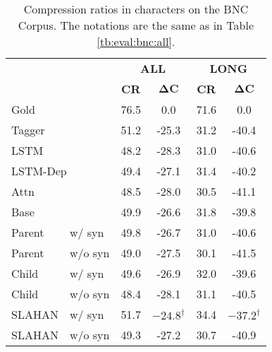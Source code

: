\documentclass[letterpaper]{article} \usepackage{aaai20}  \usepackage{times}  \usepackage{helvet} \usepackage{courier}  \usepackage[hyphens]{url}  \usepackage{graphicx} \urlstyle{rm} \def\UrlFont{\rm}  \usepackage{graphicx}  \frenchspacing  \setlength{\pdfpagewidth}{8.5in}  \setlength{\pdfpageheight}{11in}  \usepackage{tabu}
\begin{document}
\begin{table}[h]
\centering
\small
\begin{tabular}{llcccc}
\toprule
 & & \multicolumn{2}{c}{\textbf{ALL}} & \multicolumn{2}{c}{\textbf{LONG}} \\
 \cmidrule(lr){3-4}\cmidrule(lr){5-6}
 & & \textbf{CR} & $\mathbf{\Delta C}$ & \textbf{CR} & $\mathbf{\Delta C}$ \\
\midrule
\multicolumn{2}{l}{Gold}    & 76.5 & 0.0 & 71.6 & 0.0 \\
\midrule
\multicolumn{2}{l}{Tagger}  & 51.2 & -25.3 & 31.2 & -40.4 \\
\multicolumn{2}{l}{LSTM}    & 48.2 & -28.3 & 31.0 & -40.6 \\
\multicolumn{2}{l}{LSTM-Dep}& 49.4 & -27.1 & 31.4 & -40.2 \\
\multicolumn{2}{l}{Attn}    & 48.5 & -28.0 & 30.5 & -41.1 \\
\multicolumn{2}{l}{Base}    & 49.9 & -26.6 & 31.8 & -39.8 \\
Parent & w/ syn             & 49.8 & -26.7 & 31.0 & -40.6 \\
Parent & w/o syn            & 49.0 & -27.5 & 30.1 & -41.5 \\
\midrule
Child & w/ syn              & 49.6 & -26.9 & 32.0 & -39.6 \\
Child & w/o syn             & 48.4 & -28.1 & 31.1 & -40.5 \\
SLAHAN & w/ syn             & 51.7 & $\mathbf{-24.8}^{\dagger}$ & 34.4 & $\mathbf{-37.2}^{\dagger}$ \\
SLAHAN & w/o syn            & 49.3 & -27.2 & 30.7 & -40.9 \\
\bottomrule
\end{tabular}\caption{Compression ratios in characters on the BNC Corpus. The notations are the same as in Table \ref{tb:eval:bnc:all}. \label{tb:eval:bnc:cr}}
\end{table}
\end{document}
